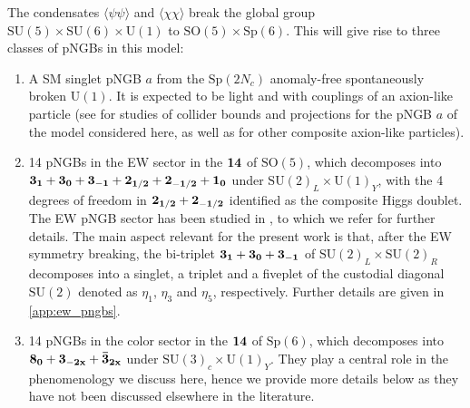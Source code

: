 \documentclass[preprintnumbers,nofootinbib,showpacs,eqsecnum,pre,12pt]{revtex4-1}
\newcommand{\SO}{\text{SO}}
\newcommand{\SU}{\text{SU}}
\newcommand{\U}{\text{U}}
\newcommand{\Sp}{\text{Sp}}
\begin{document}
The condensates $\langle \psi \psi\rangle$ and 
$\langle \chi \chi\rangle$ break the global
group $\SU(5) \times \SU(6) \times \U(1)$ to
\mbox{$\SO(5) \times \Sp(6)$}. This will give rise to three classes of pNGBs in this model:
\begin{enumerate}
 \item A SM singlet pNGB $a$ from the $\Sp(2N_c)$ anomaly-free spontaneously broken $\U(1)$. It is expected to be light and with couplings of an axion-like particle (see \cite{Belyaev:2016ftv,Cacciapaglia:2019bqz,BuarqueFranzosi:2021kky} for studies of collider bounds and projections for the pNGB $a$ of the model considered here, as well as for other composite axion-like particles).
  \item 14 pNGBs in the EW sector in the $\bf{14}$ of $\SO(5)$, which decomposes into $\bf{3}_1+\bf{3}_0+\bf{3}_{-1}+\bf{2}_{1/2}+\bf{2}_{-1/2}+\bf{1}_0$ under $\SU(2)_L\times \U(1)_Y$, with the 4 degrees of freedom in $\bf{2}_{1/2} + \bf{2}_{-1/2}$ identified as the composite Higgs doublet.
  The EW pNGB sector has been studied in \cite{Agugliaro:2018vsu}, to which we refer for further details. The main aspect relevant for the present work is that, after the EW symmetry
  breaking, the bi-triplet $\bf{3}_1+\bf{3}_0+\bf{3}_{-1}$ of $\SU(2)_L\times \SU(2)_R$ decomposes into a singlet, a triplet and
  a fiveplet of the custodial diagonal $\SU(2)$ denoted as
  $\eta_1$, $\eta_3$ and $\eta_5$, respectively.
  Further details are given in \cref{app:ew_pngbs}.

\item 14 pNGBs in the color sector in the $\bf{14}$ of $\Sp(6)$, which decomposes into $\bf{8_0}+\bf{3_{-2x}}+\bf{\bar{3}_{2x}}$ under $\SU(3)_c\times \U(1)_Y$. They play a central role in the phenomenology we discuss here, hence we provide more details below as they have not been discussed elsewhere in the literature.

\end{enumerate}
\end{document}
